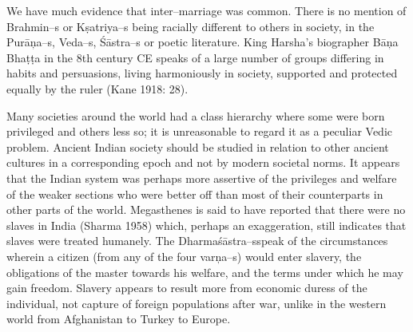 We have much evidence that inter–marriage was common. There is no mention of Brahmin–s or Kṣatriya–s being racially different to others in society, in the Purāņa–s, Veda–s, Śāstra–s or poetic literature. King Harsha’s biographer Bāņa Bhaṭṭa in the 8th century CE speaks of a large number of groups differing in habits and persuasions, living harmoniously in society, supported and protected equally by the ruler (Kane 1918: 28).

Many societies around the world had a class hierarchy where some were born privileged and others less so; it is unreasonable to regard it as a peculiar Vedic problem. Ancient Indian society should be studied in relation to other ancient cultures in a corresponding epoch and not by modern societal norms. It appears that the Indian system was perhaps more assertive of the privileges and welfare of the weaker sections who were better off than most of their counterparts in other parts of the world. Megasthenes is said to have reported that there were no slaves in India (Sharma 1958) which, perhaps an exaggeration, still indicates that slaves were treated humanely. The Dharmaśāstra–s\break speak of the circumstances wherein a citizen (from any of the four varņa–s) would enter slavery, the obligations of the master towards his welfare, and the terms under which he may gain freedom. Slavery appears to result more from economic duress of the individual, not capture of foreign populations after war, unlike in the western world from Afghanistan to Turkey to Europe.

